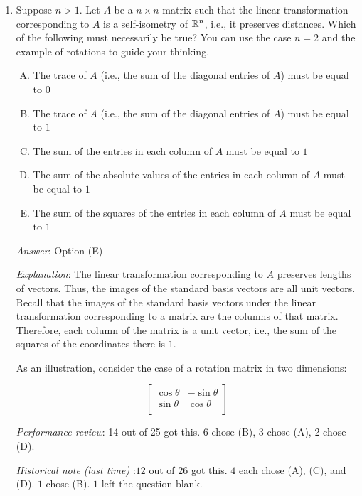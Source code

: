 \documentclass[10pt]{amsart}
\begin{document}
\begin{enumerate}
\item Suppose $n > 1$. Let $A$ be a $n \times n$ matrix such that the
  linear transformation corresponding to $A$ is a self-isometry of
  $\mathbb{R}^n$, i.e., it preserves distances. Which of the following must
  necessarily be true? You can use the case $n = 2$ and the example of
  rotations to guide your thinking.

  \begin{enumerate}[(A)]
  \item The trace of $A$ (i.e., the sum of the diagonal entries of
    $A$) must be equal to $0$
  \item The trace of $A$ (i.e., the sum of the diagonal entries of
    $A$) must be equal to $1$
  \item The sum of the entries in each column of $A$ must be equal to
    $1$
  \item The sum of the absolute values of the entries in each column
    of $A$ must be equal to $1$
  \item The sum of the squares of the entries in each column of $A$
    must be equal to $1$
  \end{enumerate}

  {\em Answer}: Option (E)

  {\em Explanation}: The linear transformation corresponding to $A$
  preserves lengths of vectors. Thus, the images of the standard basis
  vectors are all unit vectors. Recall that the images of the standard
  basis vectors under the linear transformation corresponding to a
  matrix are the columns of that matrix. Therefore, each column of the
  matrix is a unit vector, i.e., the sum of the squares of the
  coordinates there is $1$.

  As an illustration, consider the case of a rotation matrix in two dimensions:

  $$\left[ \begin{matrix} \cos \theta & -\sin \theta \\ \sin \theta & \cos \theta \\\end{matrix}\right]$$

  {\em Performance review}: 14 out of 25 got this. 6 chose (B), 3
  chose (A), 2 chose (D).

  {\em Historical note (last time)} :$12$ out of $26$ got this. $4$ each chose
  (A), (C), and (D). $1$ chose (B). $1$ left the question blank.

  \vspace{1in}


\end{enumerate}
\end{document}
